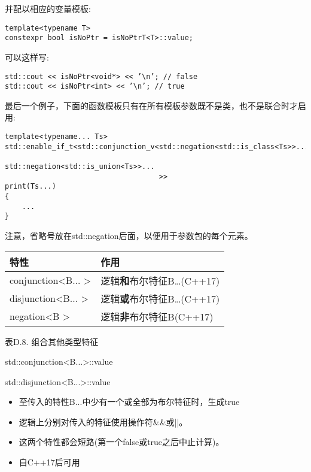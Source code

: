 并配以相应的变量模板:

\begin{lstlisting}[style=styleCXX]
template<typename T>
constexpr bool isNoPtr = isNoPtrT<T>::value;
\end{lstlisting}

可以这样写:

\begin{lstlisting}[style=styleCXX]
std::cout << isNoPtr<void*> << ’\n’; // false
std::cout << isNoPtr<int> << ’\n’; // true
\end{lstlisting}

最后一个例子，下面的函数模板只有在所有模板参数既不是类，也不是联合时才启用:

\begin{lstlisting}[style=styleCXX]
template<typename... Ts>
std::enable_if_t<std::conjunction_v<std::negation<std::is_class<Ts>>...,
									std::negation<std::is_union<Ts>>...
									>>
print(Ts...)
{
	...
}
\end{lstlisting}

注意，省略号放在std::negation后面，以便用于参数包的每个元素。

\begin{table}[H]
	\begin{center}
	\begin{tabular}{l|l}
		\hline
		\textbf{特性}                            & \textbf{作用}                                   \\ \hline
		conjunction\textless{}B... \textgreater{} & 逻辑\textbf{和}布尔特征B…(C++17) \\ \hline
		disjunction\textless{}B... \textgreater{} & 逻辑\textbf{或}布尔特征B…(C++17)  \\ \hline
		negation\textless{}B \textgreater{}       & 逻辑\textbf{非}布尔特征B(C++17)     \\ \hline
	\end{tabular}
	\end{center}
\end{table}

\begin{center}
表D.8. 组合其他类型特征
\end{center}

std::conjunction<B...>::value

std::disjunction<B...>::value

\begin{itemize}
\item 
至传入的特性B...中少有一个或全部为布尔特征时，生成true

\item 
逻辑上分别对传入的特征使用操作符\&\&或||。

\item 
这两个特性都会短路(第一个false或true之后中止计算)。

\item 
自C++17后可用
\end{itemize}

